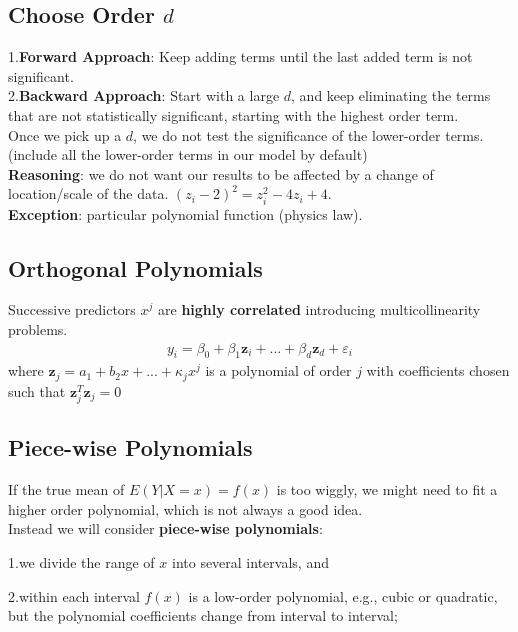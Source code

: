 \documentclass[11pt,a4paper]{article}
\begin{document}
\subsection{Choose Order $d$}
1.\textbf{Forward Approach}: Keep adding terms until the last added term is not signiﬁcant.\\
2.\textbf{Backward Approach}: Start with a large $d$, and keep eliminating the terms that are not statistically signiﬁcant, starting with the highest order term.\\

Once we pick up a $d$, we do not test the signiﬁcance of the lower-order terms. (include all the lower-order terms in our model by default)\\
\textbf{Reasoning}: we do not want our results to be affected by a change of location/scale of the data. $(z_i-2)^2=z_i^2-4z_i+4$.\\
\textbf{Exception}: particular polynomial function (physics law).


\subsection{Orthogonal Polynomials}
Successive predictors $x^j$ are \textbf{highly correlated} introducing multicollinearity problems.
\begin{equation}
    \begin{aligned}
        y_i=\beta_0+\beta_1 \mathbf{z}_i+...+\beta_d \mathbf{z}_d+\varepsilon_i
    \end{aligned}
    \nonumber
\end{equation}
where $\mathbf{z}_j=a_1+b_2x+...+\kappa_j x^j$ is a polynomial of order $j$ with coefficients chosen such that $\mathbf{z}_j^T\mathbf{z}_j=0$

\subsection{Piece-wise Polynomials}
If the true mean of $E(Y | X = x) = f (x)$ is too wiggly, we might need to ﬁt a higher order polynomial, which is not always a good idea.\\

Instead we will consider \textbf{piece-wise polynomials}:

1.we divide the range of $x$ into several intervals, and

2.within each interval $f (x)$ is a low-order polynomial, e.g., cubic or quadratic, but the polynomial coeﬃcients change from interval to interval;
\end{document}
